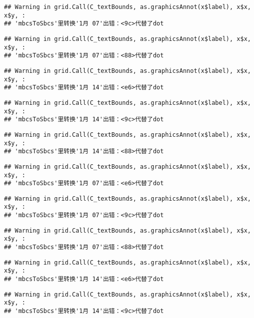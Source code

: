 \documentclass[
]{article}
\begin{document}
\begin{verbatim}
## Warning in grid.Call(C_textBounds, as.graphicsAnnot(x$label), x$x, x$y, :
## 'mbcsToSbcs'里转换'1月 07'出错：<9c>代替了dot
\end{verbatim}

\begin{verbatim}
## Warning in grid.Call(C_textBounds, as.graphicsAnnot(x$label), x$x, x$y, :
## 'mbcsToSbcs'里转换'1月 07'出错：<88>代替了dot
\end{verbatim}

\begin{verbatim}
## Warning in grid.Call(C_textBounds, as.graphicsAnnot(x$label), x$x, x$y, :
## 'mbcsToSbcs'里转换'1月 14'出错：<e6>代替了dot
\end{verbatim}

\begin{verbatim}
## Warning in grid.Call(C_textBounds, as.graphicsAnnot(x$label), x$x, x$y, :
## 'mbcsToSbcs'里转换'1月 14'出错：<9c>代替了dot
\end{verbatim}

\begin{verbatim}
## Warning in grid.Call(C_textBounds, as.graphicsAnnot(x$label), x$x, x$y, :
## 'mbcsToSbcs'里转换'1月 14'出错：<88>代替了dot
\end{verbatim}

\begin{verbatim}
## Warning in grid.Call(C_textBounds, as.graphicsAnnot(x$label), x$x, x$y, :
## 'mbcsToSbcs'里转换'1月 07'出错：<e6>代替了dot
\end{verbatim}

\begin{verbatim}
## Warning in grid.Call(C_textBounds, as.graphicsAnnot(x$label), x$x, x$y, :
## 'mbcsToSbcs'里转换'1月 07'出错：<9c>代替了dot
\end{verbatim}

\begin{verbatim}
## Warning in grid.Call(C_textBounds, as.graphicsAnnot(x$label), x$x, x$y, :
## 'mbcsToSbcs'里转换'1月 07'出错：<88>代替了dot
\end{verbatim}

\begin{verbatim}
## Warning in grid.Call(C_textBounds, as.graphicsAnnot(x$label), x$x, x$y, :
## 'mbcsToSbcs'里转换'1月 14'出错：<e6>代替了dot
\end{verbatim}

\begin{verbatim}
## Warning in grid.Call(C_textBounds, as.graphicsAnnot(x$label), x$x, x$y, :
## 'mbcsToSbcs'里转换'1月 14'出错：<9c>代替了dot
\end{verbatim}
\end{document}
